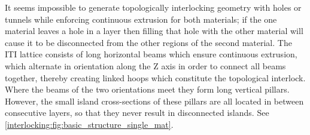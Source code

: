 It seems impossible to generate topologically interlocking geometry with holes or tunnels while enforcing continuous extrusion for both materials;
if the one material leaves a hole in a layer then filling that hole with the other material will cause it to be disconnected from the other regions of the second material.
The ITI lattice consists of long horizontal beams which ensure continuous extrusion, which alternate in orientation along the Z axis in order to connect all beams together, thereby creating linked hoops which constitute the topological interlock.
Where the beams of the two orientations meet they form long vertical pillars. %
However, the small island cross-sections of these pillars are all located in between consecutive layers, so that they never result in disconnected islands.
See \cref{interlocking:fig:basic_structure_single_mat}.



